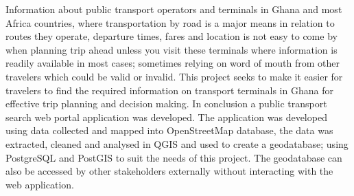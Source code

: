 

\begin{abstracts}        %
Information about public transport operators and terminals in Ghana and most Africa countries, where transportation by road is a major means in relation to routes they operate, departure times, fares and location is not easy to come by when planning trip ahead unless you visit these terminals where information is readily available in most cases; sometimes relying on word of mouth from other travelers which could be valid or invalid. This project seeks to make it easier for travelers to find the required information on transport terminals in Ghana for effective trip planning and decision making. In conclusion a public transport search web portal application was developed. The application was developed using data collected and mapped into OpenStreetMap database, the data was extracted, cleaned and analysed in QGIS and used to create a geodatabase; using PostgreSQL and PostGIS to suit the needs of this project. The geodatabase can also be accessed by other stakeholders externally without interacting with the web application.
\end{abstracts}


